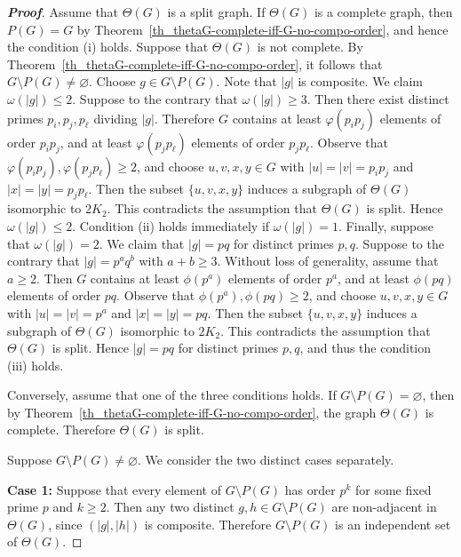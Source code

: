 \documentclass{amsart}
\theoremstyle{plain}
\theoremstyle{definition}
\begin{document}
\begin{proof}[\textbf{Proof}]
Assume that $\Theta(G)$ is a split graph. If $\Theta(G)$ is a complete graph, then $P(G) = G$ by Theorem~\ref{th_thetaG-complete-iff-G-no-compo-order}, and hence the condition \rm(i) holds. Suppose that $\Theta(G)$ is not complete. By Theorem~\ref{th_thetaG-complete-iff-G-no-compo-order}, it follows that $G\setminus P(G) \neq \varnothing$. Choose $g\in G\setminus P(G)$. Note that $|g|$ is composite. We claim $\omega(|g|)\leq 2$. Suppose to the contrary that $\omega(|g|)\geq 3$. Then there exist distinct primes $p_i, p_j, p_{\ell}$ dividing $|g|$. Therefore $G$ contains at least $\varphi(p_ip_j)$ elements of order $p_ip_j$, and at least $\varphi(p_jp_{\ell})$ elements of order $p_jp_{\ell}$. Observe that $\varphi(p_ip_j), \varphi(p_jp_{\ell})\geq 2$, and choose $u,v,x,y\in G$ with $|u| = |v| = p_ip_j$ and $|x| = |y| = p_jp_{\ell}$. 
Then the subset $\{u,v,x,y\}$ induces a subgraph of $\Theta(G)$ isomorphic to $2K_2$. This contradicts the assumption that $\Theta(G)$ is split. Hence $\omega(|g|)\leq 2$. Condition \rm(ii) holds immediately if $\omega(|g|)= 1$. Finally, suppose that $\omega(|g|)= 2$. We claim that $|g| = pq$ for distinct primes $p, q$. Suppose to the contrary that $|g|=p^{a}q^{b}$ with $a+b\geq 3$. Without loss of generality, assume that $a\geq 2$. Then $G$ contains at least $\phi(p^{a})$ elements of order $p^{a}$, and at least $\phi(pq)$ elements of order $pq$. Observe that $\phi(p^{a}), \phi(pq) \geq 2$, and choose $u,v,x,y\in G$ with $|u| = |v| = p^a$ and $|x| = |y| = pq$. Then the subset $\{u,v,x,y\}$ induces a subgraph of $\Theta(G)$ isomorphic to $2K_2$. This contradicts the assumption that $\Theta(G)$ is split. Hence $|g| = pq$ for distinct primes $p,q$, and thus the condition \rm(iii) holds. 

\vspace{0.4mm}
 
Conversely, assume that one of the three conditions holds. If $G\setminus P(G) = \varnothing$, then by Theorem~\ref{th_thetaG-complete-iff-G-no-compo-order}, the graph $\Theta(G)$ is complete. Therefore $\Theta(G)$ is split. 


\vspace{0.4mm}
Suppose $G\setminus P(G) \neq\varnothing$. We consider the two distinct cases separately.

\vspace{0.5mm}
\noindent \textbf{Case 1:} Suppose that every element of $G\setminus P(G)$ has order $p^k$ for some fixed prime $p$ and $k\geq 2$. Then any two distinct $g,h \in G\setminus P(G)$ are non-adjacent in $\Theta(G)$, since $(|g|,|h|)$ is composite. Therefore $G \setminus P(G)$ is an independent set of $\Theta(G)$.



\end{proof}
\end{document}
